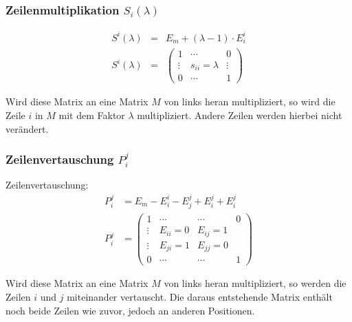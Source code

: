 \subsubsection{Zeilenmultiplikation $S_i(\lambda)$}
\begin{Def}
\begin{align*}
	S^i(\lambda) &=& E_m + (\lambda - 1) \cdot E^i_i \\
	S^i(\lambda) &=& 
	\begin{pmatrix}
	1 & \cdots & 0 \\ 
	\vdots & s_{ii} = \lambda & \vdots \\ 
	0 & \cdots & 1
	\end{pmatrix} 
\end{align*}
\end{Def}
\raggedright 
Wird diese Matrix an eine Matrix $M$ von links heran multipliziert, so wird die Zeile $i$ in $M$ mit dem Faktor $\lambda$ multipliziert. Andere Zeilen werden hierbei nicht verändert.

\subsubsection{Zeilenvertauschung $P^j_i$}
\begin{Def} Zeilenvertauschung:
\begin{align*}
	P^j_i &= E_m - E^i_i - E^j_j + E^j_i + E^j_i \\
	P^j_i &= 
	\begin{pmatrix}
	1 & \cdots & \cdots & 0 \\ 
	\vdots & E_{ii} = 0 & E_{ij} = 1 &  \\ 
	\vdots & E_{ji} = 1 & E_{jj} = 0 &  \\ 
	0 & \cdots & \cdots & 1
	\end{pmatrix} 
\end{align*}
\end{Def}
\raggedright 
Wird diese Matrix an eine Matrix $M$ von links heran multipliziert, so werden die Zeilen $i$ und $j$ miteinander vertauscht. Die daraus entstehende Matrix enthält noch beide Zeilen wie zuvor, jedoch an anderen Positionen.